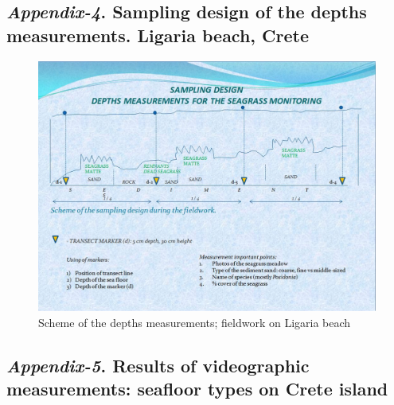 \documentclass[10pt, a4paper]{article}
\begin{document}
\begin{appendices}
\subsection{\textit{Appendix-4}. Sampling design of the depths measurements. Ligaria beach, Crete}

\begin{figure}[h]
	\begin{center}
		\includegraphics[scale=0.35]{Sampling_design.jpg}
		\caption{Scheme of the depths measurements; fieldwork on Ligaria beach}\label{fig:A.4}
	\end{center}	
\end{figure}
\pagebreak

\subsection{\textit{Appendix-5}. Results of videographic measurements: seafloor types on Crete island}


\end{appendices}
\end{document}
